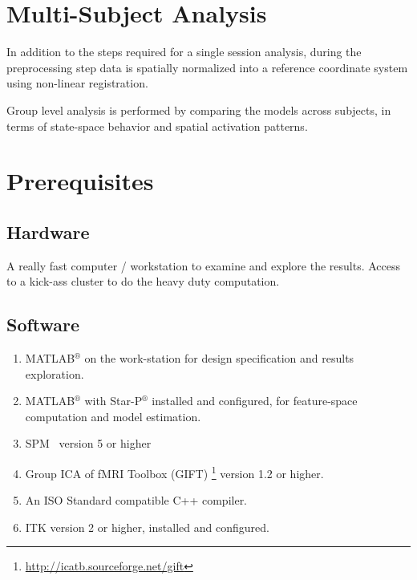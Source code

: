 \section{Multi-Subject Analysis}
In addition to the steps required for a single session analysis,
during the preprocessing step  data is spatially normalized into a
reference coordinate system using non-linear registration.

Group level analysis is performed by comparing the models across
subjects, in terms of state-space behavior and spatial activation
patterns.

\section{Prerequisites}

\subsection{Hardware}
A really fast computer / workstation to examine and explore the
results. Access to a kick-ass cluster to do the heavy duty
computation.

\subsection{Software}
\begin{enumerate}
  \item MATLAB$^\circledR$ on the work-station for design
  specification and results exploration.
  \item MATLAB$^\circledR$ with Star-P$^\circledR$ installed and
  configured, for feature-space computation and model estimation.
  \item SPM~\cite{TheFILMethodsGroup2011} version 5 or higher
  \item Group ICA of fMRI Toolbox (GIFT) \footnote{\url{http://icatb.sourceforge.net/gift}} version 1.2 or higher.
  \item An ISO Standard compatible C++ compiler.
  \item ITK\cite{Ibanez2003} version 2 or higher, installed and configured.
\end{enumerate}
